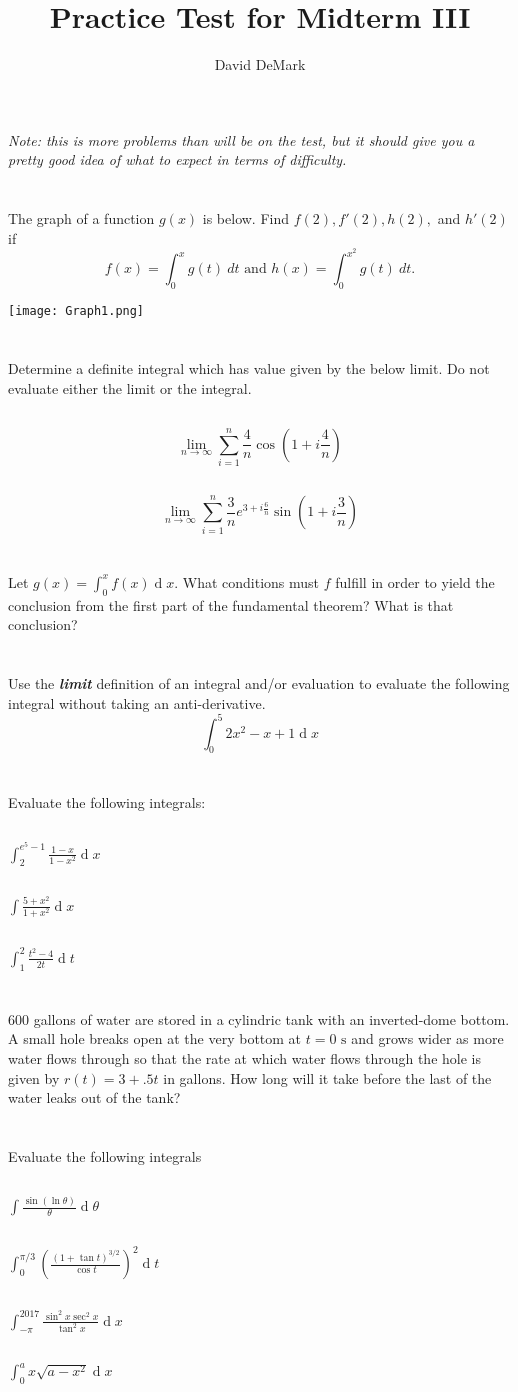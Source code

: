 \documentclass[english]{article}
\title{Practice Test for Midterm III}
\author{David DeMark}
\date{\due}
\renewcommand{\d}[1]{\ensuremath{\operatorname{d}\!{#1}}}
\newcommand{\prob}[1]{\setcounter{section}{#1-1}\section{}}
\newcommand{\prt}[1]{\setcounter{subsection}{#1-1}\subsection{}}
\theoremstyle{remark}
\theoremstyle{definition}
\newcommand{\st}{\text{ s}}
\begin{document}
	\maketitle
	\emph{Note: this is more problems than will be on the test, but it should give you a pretty good idea of what to expect in terms of difficulty.}
\prob{1} The graph of a function $g(x)$ is below. Find $f(2), f'(2), h(2),$ and $h'(2)$ if $$f(x) = \int_0^x g(t)\ dt \text{ and }
h(x) = \int_0^{x^2} g(t)\ dt.$$
\begin{center}
	\texttt{[image: Graph1.png]}
\end{center}\vspace{6cm}
\prob{2}Determine a definite integral which has value given by the below limit. Do not evaluate either the limit or the integral.
\prt{1} $$\lim_{n\to \infty}\sum_{i=1}^n \frac{4}{n}\cos(1+i\frac{4}{n})$$\newpage
\prt{2}  $$\lim_{n\to \infty}\sum_{i=1}^n \frac{3}{n}e^{3+i\frac{6}{n}}\sin(1+i\frac{3}{n})$$
\vspace{3.5cm}\prob{3} Let $g(x)=\int_0^xf(x)\d x$.
What conditions must $f$ fulfill in order to yield the conclusion from the first part of the fundamental theorem? What is that conclusion?
\vspace{6cm}
\prob{4} Use the \textbf{\emph{limit}} definition of an integral and/or evaluation  to evaluate the following integral without taking an anti-derivative. $$\int_0^5 2x^2-x+1\d x$$\newpage\prob{4}
Evaluate the following integrals:
\prt{1}
$\displaystyle{\int_2^{e^5-1} \frac{1-x}{1-x^2}\d x}$\vspace{3cm}
\prt{2}
$\displaystyle{\int \frac{5+x^2}{1+x^2}\d x}$\vspace{3cm}
\prt{3}
$\displaystyle{\int_1^2 \frac{t^2-4}{2t}\d t}$\vspace{3cm}

\prob{6} 600 gallons of water are stored in a cylindric tank with an inverted-dome bottom. A small hole breaks open at the very bottom at $t=0\st$ and grows wider as more water flows through so that the rate at which water flows through the hole is given by $r(t)=3+.5t$ in gallons. How long will it take before the last of the water leaks out of the tank?\newpage
\prob{7} Evaluate the following integrals

\prt{1}
$\displaystyle{\int\frac{\sin(\ln \theta)}{\theta}\d \theta}$\vspace{4cm}
\prt{2}$\displaystyle{\int_0^{\pi/3}\left(\frac{(1+\tan t)^{3/2}}{\cos t}\right)^2 \d t}$\vspace{4cm}
\prt{3}$\displaystyle{\int_{-\pi}^{2017} \frac{\sin^2x\sec^2 x}{\tan^2x}\d x}$\vspace{4cm}
\prt{4}
$\displaystyle{\int_{0}^a x\sqrt{a-x^2}\d x}$\vspace{4cm}
\end{document}
